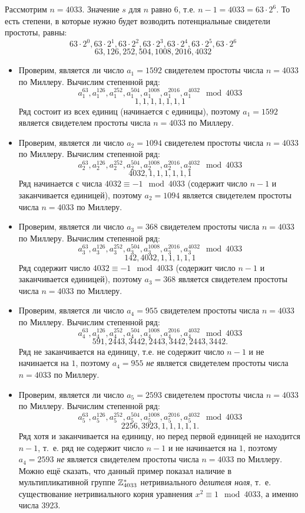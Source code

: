 \example
Рассмотрим $n=4033$. Значение $s$ для $n$ равно $6$, т.е. $n - 1 = 4033 = 63 \cdot 2^6$. То есть степени, в которые нужно будет возводить потенциальные свидетели простоты, равны:
\[ 63 \cdot 2^0, 63 \cdot 2^1, 63 \cdot 2^2, 63 \cdot 2^3, 63 \cdot 2^4, 63 \cdot 2^5, 63 \cdot 2^6 \]
\[ 63, 126, 252, 504, 1008, 2016, 4032 \]
\begin{itemize}
	\item Проверим, является ли число $a_1 = 1592$ свидетелем простоты числа $n = 4033$ по Миллеру. Вычислим степенной ряд:
		\[ a_1^{63}, a_1^{126}, a_1^{252}, a_1^{504}, a_1^{1008}, a_1^{2016}, a_1^{4032} \mod 4033 \]
		\[ 1, 1, 1, 1, 1, 1, 1 \]
		Ряд состоит из всех единиц (начинается с единицы), поэтому $a_1 = 1592$ является свидетелем простоты числа $n = 4033$ по Миллеру.
	\item Проверим, является ли число $a_2 = 1094$ свидетелем простоты числа $n = 4033$ по Миллеру. Вычислим степенной ряд:
		\[ a_2^{63}, a_2^{126}, a_2^{252}, a_2^{504}, a_2^{1008}, a_2^{2016}, a_2^{4032} \mod 4033 \]
		\[ 4032, 1, 1, 1, 1, 1, 1 \]
		Ряд начинается с числа $4032 \equiv -1 \mod 4033$ (содержит число $n-1$ и заканчивается единицей), поэтому $a_2 = 1094$ является свидетелем простоты числа $n = 4033$ по Миллеру.
	\item Проверим, является ли число $a_3 = 368$ свидетелем простоты числа $n = 4033$ по Миллеру. Вычислим степенной ряд:
		\[ a_3^{63}, a_3^{126}, a_3^{252}, a_3^{504}, a_3^{1008}, a_3^{2016}, a_3^{4032} \mod 4033 \]
		\[ 142, 4032, 1, 1, 1, 1, 1 \]
		Ряд содержит число $4032 \equiv -1 \mod 4033$ (содержит число $n-1$ и заканчивается единицей), поэтому $a_3 = 368$ является свидетелем простоты числа $n = 4033$ по Миллеру.
	\item Проверим, является ли число $a_4 = 955$ свидетелем простоты числа $n = 4033$ по Миллеру. Вычислим степенной ряд:
		\[ a_4^{63}, a_4^{126}, a_4^{252}, a_4^{504}, a_4^{1008}, a_4^{2016}, a_4^{4032} \mod 4033 \]
		\[ 591, 2443, 3442, 2443, 3442, 2443, 3442. \]
		Ряд не заканчивается на единицу, т.е. не содержит число $n-1$ и не начинается на $1$, поэтому $a_4 = 955$ \emph{не} является свидетелем простоты числа $n = 4033$ по Миллеру.
	\item Проверим, является ли число $a_5 = 2593$ свидетелем простоты числа $n = 4033$ по Миллеру. Вычислим степенной ряд:
		\[ a_5^{63}, a_5^{126}, a_5^{252}, a_5^{504}, a_5^{1008}, a_5^{2016}, a_5^{4032} \mod 4033 \]
		\[ 2256, 3923, 1, 1, 1, 1, 1. \]
		Ряд хотя и заканчивается на единицу, но перед первой единицей не находится $n-1$, т.~е. ряд не содержит число $n-1$ и не начинается на $1$, поэтому $a_4 = 2593$ \emph{не} является свидетелем простоты числа $n = 4033$ по Миллеру. Можно ещё сказать, что данный пример показал наличие в мультипликативной группе $\mathbb{Z}_{4033}^{*}$ нетривиального \emph{делителя ноля}, т.~е. существование нетривиального корня уравнения $ x^2 \equiv 1 \mod 4033$, а именно числа 3923.
\end{itemize}
\exampleend

